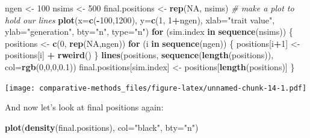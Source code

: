 \documentclass[]{article}
\newenvironment{Shaded}{\begin{snugshade}}{\end{snugshade}}
\newcommand{\CommentTok}[1]{\textcolor[rgb]{0.56,0.35,0.01}{\textit{#1}}}
\newcommand{\ControlFlowTok}[1]{\textcolor[rgb]{0.13,0.29,0.53}{\textbf{#1}}}
\newcommand{\DataTypeTok}[1]{\textcolor[rgb]{0.13,0.29,0.53}{#1}}
\newcommand{\DecValTok}[1]{\textcolor[rgb]{0.00,0.00,0.81}{#1}}
\newcommand{\FloatTok}[1]{\textcolor[rgb]{0.00,0.00,0.81}{#1}}
\newcommand{\KeywordTok}[1]{\textcolor[rgb]{0.13,0.29,0.53}{\textbf{#1}}}
\newcommand{\NormalTok}[1]{#1}
\newcommand{\OperatorTok}[1]{\textcolor[rgb]{0.81,0.36,0.00}{\textbf{#1}}}
\newcommand{\OtherTok}[1]{\textcolor[rgb]{0.56,0.35,0.01}{#1}}
\newcommand{\StringTok}[1]{\textcolor[rgb]{0.31,0.60,0.02}{#1}}
\theoremstyle{definition}
\theoremstyle{definition}
\theoremstyle{definition}
\theoremstyle{remark}
\begin{document}
\begin{Shaded}
\begin{Highlighting}[]
\NormalTok{ngen <-}\StringTok{ }\DecValTok{100}
\NormalTok{nsims <-}\StringTok{ }\DecValTok{500}
\NormalTok{final.positions <-}\StringTok{ }\KeywordTok{rep}\NormalTok{(}\OtherTok{NA}\NormalTok{, nsims)}
\CommentTok{# make a plot to hold our lines}
\KeywordTok{plot}\NormalTok{(}\DataTypeTok{x=}\KeywordTok{c}\NormalTok{(}\OperatorTok{-}\DecValTok{100}\NormalTok{,}\DecValTok{1200}\NormalTok{), }\DataTypeTok{y=}\KeywordTok{c}\NormalTok{(}\DecValTok{1}\NormalTok{, }\DecValTok{1}\OperatorTok{+}\NormalTok{ngen), }\DataTypeTok{xlab=}\StringTok{"trait value"}\NormalTok{, }\DataTypeTok{ylab=}\StringTok{"generation"}\NormalTok{, }\DataTypeTok{bty=}\StringTok{"n"}\NormalTok{, }\DataTypeTok{type=}\StringTok{"n"}\NormalTok{)}
\ControlFlowTok{for}\NormalTok{ (sim.index }\ControlFlowTok{in} \KeywordTok{sequence}\NormalTok{(nsims)) \{}
\NormalTok{  positions <-}\StringTok{ }\KeywordTok{c}\NormalTok{(}\DecValTok{0}\NormalTok{, }\KeywordTok{rep}\NormalTok{(}\OtherTok{NA}\NormalTok{,ngen))}
  \ControlFlowTok{for}\NormalTok{ (i }\ControlFlowTok{in} \KeywordTok{sequence}\NormalTok{(ngen)) \{}
\NormalTok{    positions[i}\OperatorTok{+}\DecValTok{1}\NormalTok{] <-}\StringTok{ }\NormalTok{positions[i] }\OperatorTok{+}\StringTok{ }\KeywordTok{rweird}\NormalTok{()}
\NormalTok{  \}}
  \KeywordTok{lines}\NormalTok{(positions, }\KeywordTok{sequence}\NormalTok{(}\KeywordTok{length}\NormalTok{(positions)), }\DataTypeTok{col=}\KeywordTok{rgb}\NormalTok{(}\DecValTok{0}\NormalTok{,}\DecValTok{0}\NormalTok{,}\DecValTok{0}\NormalTok{,}\FloatTok{0.1}\NormalTok{))}
\NormalTok{  final.positions[sim.index] <-}\StringTok{ }\NormalTok{positions[}\KeywordTok{length}\NormalTok{(positions)]}
\NormalTok{\}}
\end{Highlighting}
\end{Shaded}

\texttt{[image: comparative-methods\_files/figure-latex/unnamed-chunk-14-1.pdf]}

And now let's look at final positions again:

\begin{Shaded}
\begin{Highlighting}[]
\KeywordTok{plot}\NormalTok{(}\KeywordTok{density}\NormalTok{(final.positions), }\DataTypeTok{col=}\StringTok{"black"}\NormalTok{, }\DataTypeTok{bty=}\StringTok{"n"}\NormalTok{)}
\end{Highlighting}
\end{Shaded}
\end{document}
